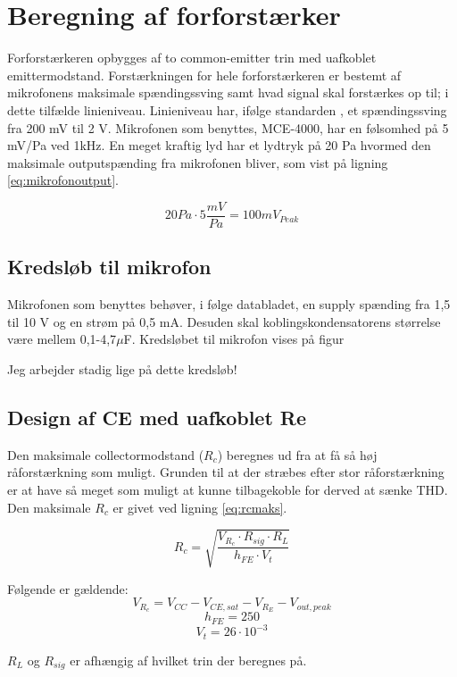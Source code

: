 \section{Beregning af forforstærker}
Forforstærkeren opbygges af to common-emitter trin med uafkoblet emittermodstand. Forstærkningen for hele forforstærkeren er bestemt af mikrofonens maksimale spændingssving samt hvad signal skal forstærkes op til; i dette tilfælde linieniveau. Linieniveau har, ifølge standarden , et spændingssving fra 200 mV til 2 V. Mikrofonen som benyttes, MCE-4000, har en følsomhed på 5 mV/Pa ved 1kHz. En meget kraftig lyd har et lydtryk på 20 Pa  hvormed den maksimale outputspænding fra mikrofonen bliver, som vist på ligning \ref{eq:mikrofonoutput}.

\begin{equation}
20 Pa \cdot 5 \frac{mV}{Pa} = 100 mV_{Peak}
\label{eq:mikrofonoutput}
\end{equation}

\subsection*{Kredsløb til mikrofon}

Mikrofonen som benyttes behøver, i følge databladet, en supply spænding fra 1,5 til 10 V og en strøm på 0,5 mA. Desuden skal koblingskondensatorens størrelse være mellem 0,1-4,7$\mu$F. Kredsløbet til mikrofon vises på figur %


Jeg arbejder stadig lige på dette kredsløb!


\subsection*{Design af CE med uafkoblet Re}

Den maksimale collectormodstand ($R_c$) beregnes ud fra at få så høj råforstærkning som muligt. Grunden til at der stræbes efter stor råforstærkning er at have så meget som muligt at kunne tilbagekoble for derved at sænke THD. Den maksimale $R_c$ er givet ved ligning \ref{eq:rcmaks}.


\begin{equation}
R_c = \sqrt{\frac{ V_{R_c} \cdot R_{sig} \cdot R_L } { h_{FE} \cdot V_t}}
\label{eq:rcmaks}
\end{equation}

Følgende er gældende:
\begin{equation}
V_{R_c} = V_{CC} - V_{CE,sat} - V_{R_E} - V_{out,peak}
\end{equation}
\begin{equation}
h_{FE} = 250
\end{equation}
\begin{equation}
V_t = 26 \cdot 10^{-3}
\end{equation}

$R_L$ og $R_{sig}$ er afhængig af hvilket trin der beregnes på. 